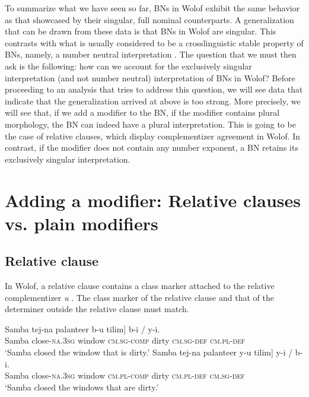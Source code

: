 \documentclass[output=paper]{langscibook}
\begin{document}
\noindent To summarize what we have seen so far, BNs in Wolof exhibit the same behavior as that showcased by their singular, full nominal counterparts. A generalization that can be drawn from these data is that BNs in Wolof are singular. This contrasts with what is usually considered to be a crosslinguistic stable property of BNs, namely, a number neutral interpretation \citep{dayal2011hindi}. The question that we must then ask is the following: how can we account for the exclusively singular interpretation (and not number neutral) interpretation of BNs in Wolof? Before proceeding to an analysis that tries to address this question, we will see data that indicate that the generalization arrived at above is too strong. More precisely, we will see that, if we add a modifier to the BN, if the modifier contains plural morphology, the BN can indeed have a plural interpretation. This is going to be the case of relative clauses, which display complementizer agreement in Wolof. In contrast, if the modifier does not contain any number exponent, a BN retains its exclusively singular interpretation.

\section{Adding a modifier: Relative clauses vs. plain modifiers}

\subsection{Relative clause}
\label{fon:sEk:ReLl}

In Wolof, a relative clause contains a class marker \citep{loporcaroBabou16} attached to the relative complementizer \textit{u} \citep{torrence2013clause}. The class marker of the relative clause and that of the determiner outside the relative clause must match.
		
    \ea
		\ea \gll	Samba tej-na palanteer \minsp{[} b-u tilim] b-i / \hspace{30pt} \minsp{*} y-i.\\
				Samba close-\textsc{na.3sg} window {} \textsc{cm.sg-comp} dirty \textsc{cm.sg-def} {} {} {} \textsc{cm.pl-def}\\
				\glt    `Samba closed the window that is dirty.'\label{fon:kOnkmT2}
		\ex \gll	Samba tej-na palanteer \minsp{[} y-u tilim] y-i / \hspace{30pt} \minsp{*} b-i.\\
				Samba close-\textsc{na.3sg} window {} \textsc{cm.pl-comp} dirty  \textsc{cm.pl-def} {} {} {} \textsc{cm.sg-def}\\
				\glt    `Samba closed the windows that are dirty.'\label{fon:kOnkmT3}
		\z
	\z
	
\end{document}

